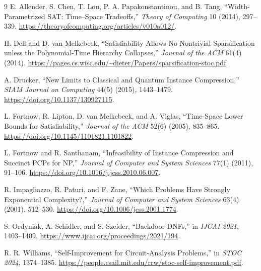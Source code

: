 \documentclass[11pt]{article}
\begin{document}
\begin{thebibliography}{9}
E. Allender, S. Chen, T. Lou, P. A. Papakonstantinou, and B. Tang,
``Width-Parametrized SAT: Time--Space Tradeoffs,''
\emph{Theory of Computing} 10 (2014), 297--339.
\url{https://theoryofcomputing.org/articles/v010a012/}.

H. Dell and D. van Melkebeek,
``Satisfiability Allows No Nontrivial Sparsification unless the Polynomial-Time
Hierarchy Collapses,'' \emph{Journal of the ACM} 61(4) (2014).
\url{https://pages.cs.wisc.edu/~dieter/Papers/sparsification-stoc.pdf}.

A. Drucker, ``New Limits to Classical and Quantum Instance Compression,''
\emph{SIAM Journal on Computing} 44(5) (2015), 1443--1479.
\url{https://doi.org/10.1137/130927115}.

L. Fortnow, R. Lipton, D. van Melkebeek, and A. Viglas,
``Time-Space Lower Bounds for Satisfiability,''
\emph{Journal of the ACM} 52(6) (2005), 835--865.
\url{https://doi.org/10.1145/1101821.1101822}.

L. Fortnow and R. Santhanam,
``Infeasibility of Instance Compression and Succinct PCPs for NP,''
\emph{Journal of Computer and System Sciences} 77(1) (2011), 91--106.
\url{https://doi.org/10.1016/j.jcss.2010.06.007}.

R. Impagliazzo, R. Paturi, and F. Zane,
``Which Problems Have Strongly Exponential Complexity?,''
\emph{Journal of Computer and System Sciences} 63(4) (2001), 512--530.
\url{https://doi.org/10.1006/jcss.2001.1774}.

S. Ordyniak, A. Schidler, and S. Szeider,
``Backdoor DNFs,'' in \emph{IJCAI 2021}, 1403--1409.
\url{https://www.ijcai.org/proceedings/2021/194}.

R. R. Williams, ``Self-Improvement for Circuit-Analysis Problems,''
in \emph{STOC 2024}, 1374--1385.
\url{https://people.csail.mit.edu/rrw/stoc-self-improvement.pdf}.
\end{thebibliography}

\end{document}
